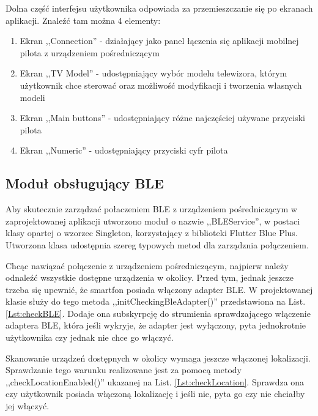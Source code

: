 \documentclass[12pt,twoside]{article}
\begin{document}
Dolna część interfejsu użytkownika odpowiada za przemieszczanie się po ekranach aplikacji. Znaleźć tam można 4 elementy:
\begin{enumerate}[label=\alph*), leftmargin=1.25cm]
   \item Ekran ,,Connection'' - działający jako panel łączenia się aplikacji mobilnej pilota z urządzeniem pośredniczącym
   \item Ekran ,,TV Model'' - udostępniający wybór modelu telewizora, którym użytkownik chce sterować oraz możliwość modyfikacji i tworzenia własnych modeli
   \item Ekran ,,Main buttons'' - udostępniający różne najczęściej używane przyciski pilota
   \item Ekran ,,Numeric'' - udostępniający przyciski cyfr pilota
\end{enumerate}

\subsection{Moduł obsługujący BLE}
Aby skutecznie zarządzać połaczeniem BLE z urządzeniem pośredniczącym w zaprojektowanej aplikacji utworzono moduł o nazwie ,,BLEService'', w postaci klasy opartej o wzorzec Singleton, korzystający z biblioteki Flutter Blue Plus\cite{flutterBluePlus}. Utworzona klasa udostępnia szereg typowych metod dla zarządznia połączeniem.

Chcąc nawiązać połączenie z urządzeniem pośredniczącym, najpierw należy odnaleźć wszystkie dostępne urządzenia w okolicy. Przed tym, jednak jeszcze trzeba się upewnić, że smartfon posiada włączony adapter BLE. W projektowanej klasie służy do tego metoda ,,initCheckingBleAdapter()'' przedstawiona na List. \ref*{Lst:checkBLE}. Dodaje ona subskyrpcję do strumienia sprawdzającego włączenie adaptera BLE, która jeśli wykryje, że adapter jest wyłączony, pyta jednokrotnie użytkownika czy jednak nie chce go włączyć.



Skanowanie urządzeń dostępnych w okolicy wymaga jeszcze włączonej lokalizacji. Sprawdzanie tego warunku realizowane jest za pomocą metody ,,checkLocationEnabled()'' ukazanej na List. \ref*{Lst:checkLocation}. Sprawdza ona czy użytkownik posiada włączoną lokalizację i jeśli nie, pyta go czy nie chciałby jej włączyć.


\end{document}
